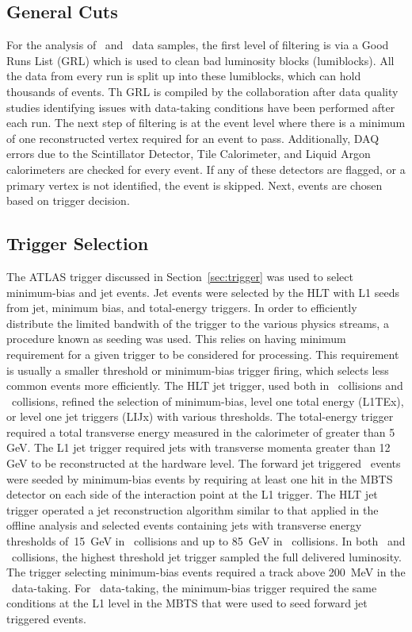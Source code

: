 \subsection{General Cuts}
For the analysis of \pp\ and \pPb\ data samples, the first level of filtering is via a Good Runs List (GRL) which is used to clean bad luminosity blocks (lumiblocks). All the data from every run is split up into these lumiblocks, which can hold thousands of events. Th GRL is compiled by the collaboration after data quality studies identifying issues with data-taking conditions have been performed after each run. The next step of filtering is at the event level where there is a minimum of one reconstructed vertex required for an event to pass. Additionally, DAQ errors due to the Scintillator Detector, Tile Calorimeter, and Liquid Argon calorimeters are checked for every event. If any of these detectors are flagged, or a primary vertex is not identified, the event is skipped. Next, events are chosen based on trigger decision.

\subsection{Trigger Selection}

The ATLAS trigger discussed in Section~\ref{sec:trigger} was used to select minimum-bias and jet events. Jet events were selected by the HLT with L1 seeds from jet, minimum bias, and total-energy triggers. In order to efficiently distribute the limited bandwith of the trigger to the various physics streams, a procedure known as seeding was used. This relies on having minimum requirement for a given trigger to be considered for processing. This requirement is usually a smaller threshold or minimum-bias trigger firing, which selects less common events more efficiently. The HLT jet trigger, used both in \pPb\ collisions and \pp\ collisions, refined the selection of minimum-bias, level one total energy (L1TEx), or level one jet triggers (LIJx) with various thresholds. The total-energy trigger required a total transverse energy measured in the calorimeter of greater than 5 GeV. The L1 jet trigger required jets with transverse momenta greater than 12 GeV to be reconstructed at the hardware level. The forward jet triggered \pPb\ events were seeded by minimum-bias events by requiring at least one hit in the MBTS detector on each side of the interaction point at the L1 trigger. The HLT jet trigger operated a jet reconstruction algorithm similar to that applied in the offline analysis and selected events containing jets with transverse energy thresholds of~15~GeV in \pPb\ collisions and up to 85~GeV in \pp\ collisions. In both \pp\ and \pPb\ collisions, the highest threshold jet trigger sampled the full delivered luminosity. The trigger selecting minimum-bias events required a track above 200~MeV in the \pp\ data-taking. For \pPb\ data-taking, the minimum-bias trigger required the same conditions at the L1 level in the MBTS that were used to seed forward jet triggered events. 
          
